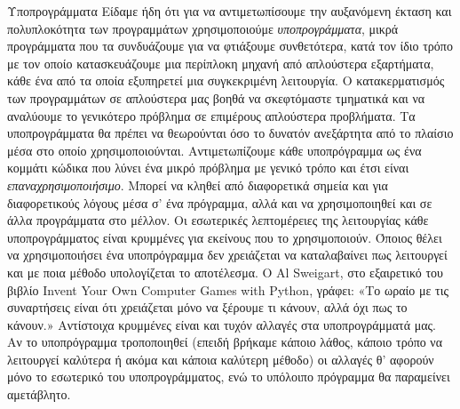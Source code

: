 \documentclass[a4paper,11pt,oneside]{book}
\begin{document}
{{{\begin{theory}{Υποπρογράμματα}
Είδαμε ήδη ότι για να αντιμετωπίσουμε την αυξανόμενη έκταση και πολυπλοκότητα των προγραμμάτων χρησιμοποιούμε \emph{υποπρογράμματα}, μικρά προγράμματα που τα συνδυάζουμε για να φτιάξουμε συνθετότερα, κατά τον ίδιο τρόπο με τον οποίο κατασκευάζουμε μια περίπλοκη μηχανή από απλούστερα εξαρτήματα, κάθε ένα από τα οποία εξυπηρετεί μια συγκεκριμένη λειτουργία. Ο κατακερματισμός των προγραμμάτων σε απλούστερα μας βοηθά να σκεφτόμαστε τμηματικά και να αναλύουμε το γενικότερο πρόβλημα σε επιμέρους απλούστερα προβλήματα. Τα υποπρογράμματα θα πρέπει να θεωρούνται όσο το δυνατόν ανεξάρτητα από το πλαίσιο μέσα στο οποίο χρησιμοποιούνται. Αντιμετωπίζουμε κάθε υποπρόγραμμα ως ένα κομμάτι κώδικα που λύνει ένα μικρό πρόβλημα με γενικό τρόπο και έτσι είναι \emph{επαναχρησιμοποιήσιμο}. Μπορεί να κληθεί από διαφορετικά σημεία και για διαφορετικούς λόγους μέσα σ' ένα πρόγραμμα, αλλά και να χρησιμοποιηθεί και σε άλλα προγράμματα στο μέλλον. 
Οι εσωτερικές λεπτομέρειες της λειτουργίας κάθε υποπρογράμματος είναι κρυμμένες για εκείνους που το χρησιμοποιούν. Όποιος θέλει να χρησιμοποιήσει ένα υποπρόγραμμα δεν χρειάζεται να καταλαβαίνει πως λειτουργεί και με ποια μέθοδο υπολογίζεται το αποτέλεσμα. Ο Al Sweigart, στο εξαιρετικό του βιβλίο Invent Your Own Computer Games with Python, γράφει: «Το ωραίο με τις συναρτήσεις είναι ότι χρειάζεται μόνο να ξέρουμε τι κάνουν, αλλά όχι πως το κάνουν.» Αντίστοιχα κρυμμένες είναι και τυχόν αλλαγές στα υποπρογράμματά μας. Αν το υποπρόγραμμα τροποποιηθεί (επειδή βρήκαμε κάποιο λάθος, κάποιο τρόπο να λειτουργεί καλύτερα ή ακόμα και κάποια καλύτερη μέθοδο) οι αλλαγές θ' αφορούν μόνο το εσωτερικό του υποπρογράμματος, ενώ το υπόλοιπο πρόγραμμα θα παραμείνει αμετάβλητο.

\end{theory}

}}}
\end{document}

